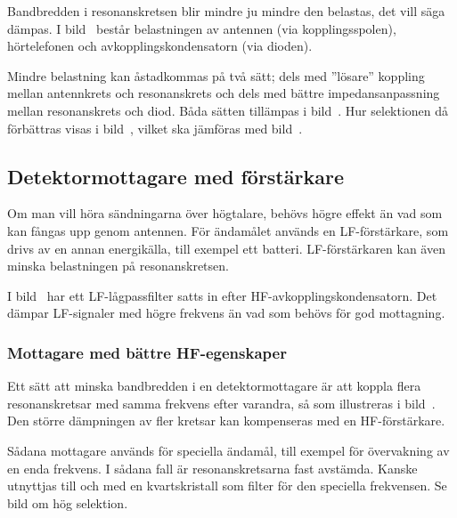 Bandbredden i resonanskretsen blir mindre ju mindre den belastas,
det vill säga dämpas.
I bild~ består belastningen av antennen (via
kopplingsspolen), hörtelefonen och avkopplingskondensatorn (via dioden).

Mindre belastning kan åstadkommas på två sätt; dels med ''lösare''
koppling mellan antennkrets och resonanskrets och dels med bättre
impedansanpassning mellan resonanskrets och diod.
Båda sätten tillämpas i bild~.
Hur selektionen då förbättras visas i bild~, vilket ska
jämföras med bild~.



\subsection{Detektormottagare med förstärkare}

Om man vill höra sändningarna över högtalare, behövs högre effekt än
vad som kan fångas upp genom antennen.
För ändamålet används en LF-förstärkare, som drivs av en annan energikälla,
till exempel ett batteri.
LF-förstärkaren kan även minska belastningen på resonanskretsen.

I bild~ har ett LF-lågpassfilter satts in efter
HF-avkopplingskondensatorn.
Det dämpar LF-signaler med högre frekvens än vad som behövs för god mottagning.

\subsubsection{Mottagare med bättre HF-egenskaper}
\label{mottagare_bättre_hf}

Ett sätt att minska bandbredden i en detektormottagare är att koppla
flera resonanskretsar med samma frekvens efter varandra, så som illustreras
i bild~.
Den större dämpningen av fler kretsar kan kompenseras med en HF-förstärkare.

Sådana mottagare används för speciella ändamål, till exempel för övervakning
av en enda frekvens.
I sådana fall är resonanskretsarna fast avstämda.
Kanske utnyttjas till och med en kvartskristall som filter för den speciella
frekvensen.
Se bild  om hög selektion.

